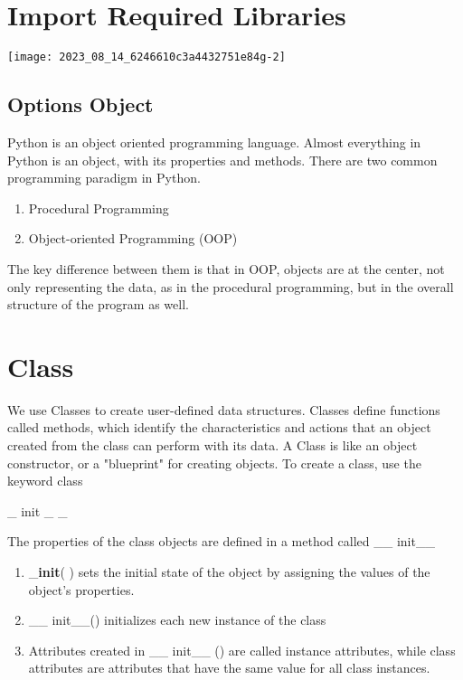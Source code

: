 \documentclass[10pt]{article}
\begin{document}
\section*{Import Required Libraries}
\begin{center}
\texttt{[image: 2023\_08\_14\_6246610c3a4432751e84g-2]}
\end{center}

\subsection*{Options Object}
Python is an object oriented programming language. Almost everything in Python is an object, with its properties and methods. There are two common programming paradigm in Python.

\begin{enumerate}
  \item Procedural Programming

  \item Object-oriented Programming (OOP)

\end{enumerate}

The key difference between them is that in OOP, objects are at the center, not only representing the data, as in the procedural programming, but in the overall structure of the program as well.

\section*{Class}
We use Classes to create user-defined data structures. Classes define functions called methods, which identify the characteristics and actions that an object created from the class can perform with its data. A Class is like an object constructor, or a "blueprint" for creating objects. To create a class, use the keyword class

\_ init \_ \_

The properties of the class objects are defined in a method called \_\_ init\_\_

\begin{enumerate}
  \item \_\textbf{init}( ) sets the initial state of the object by assigning the values of the object's properties.

  \item \_\_ init\_\_() initializes each new instance of the class

  \item Attributes created in \_\_ init\_\_ () are called instance attributes, while class attributes are attributes that have the same value for all class instances.

\end{enumerate}
\end{document}
